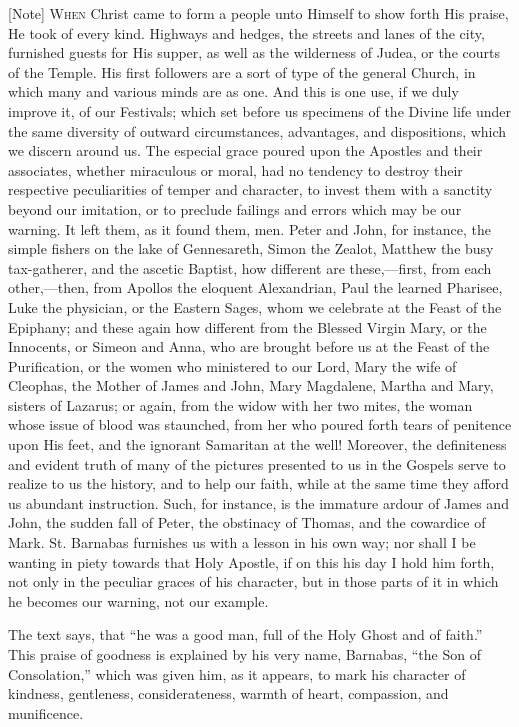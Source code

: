 [Note] W\textsc{hen} Christ came to form a
people unto Himself to show forth His praise, He took of every kind.
Highways and hedges, the streets and lanes of the city, furnished guests
for His supper, as well as the wilderness of Judea, or the courts of the
Temple. His first followers are a sort of type of the general Church, in
which many and various minds are as one. And this is one use, if we duly
improve it, of our Festivals; which set before us specimens of the
Divine life under the same diversity of outward circumstances,
advantages, and dispositions, which we discern around us. The especial
grace poured upon the Apostles and their associates, whether miraculous
or moral, had no tendency to destroy their respective peculiarities of
temper and character, to invest them with a sanctity beyond our
imitation, or to preclude failings and errors which may be our warning.
It left them, as it found them, men. Peter and John, for instance, the
simple fishers on the lake of Gennesareth, Simon the Zealot, Matthew the
busy tax-gatherer, and the ascetic Baptist, how different are these,—first,
from each other,—then, from Apollos the eloquent Alexandrian, Paul the
learned Pharisee, Luke the physician, or the Eastern Sages, whom we
celebrate at the Feast of the Epiphany; and these again how different
from the Blessed Virgin Mary, or the Innocents, or Simeon and Anna, who
are brought before us at the Feast of the Purification, or the women who
ministered to our Lord, Mary the wife of Cleophas, the Mother of James
and John, Mary Magdalene, Martha and Mary, sisters of Lazarus; or again,
from the widow with her two mites, the woman whose issue of blood was
staunched, from her who poured forth tears of penitence upon His feet,
and the ignorant Samaritan at the well! Moreover, the definiteness and
evident truth of many of the pictures presented to us in the Gospels
serve to realize to us the history, and to help our faith, while at the
same time they afford us abundant instruction. Such, for instance, is
the immature ardour of James and John, the sudden fall of Peter, the
obstinacy of Thomas, and the cowardice of Mark. St. Barnabas furnishes
us with a lesson in his own way; nor shall I be wanting in piety towards
that Holy Apostle, if on this his day I hold him forth, not only in the
peculiar graces of his character, but in those parts of it in which he
becomes our warning, not our example.

The text says, that ``he was a good man, full of the Holy Ghost
and of faith.'' This praise of goodness is explained by his very
name, Barnabas, ``the Son of Consolation,'' which was given him,
as it appears, to mark his character of kindness, gentleness,
considerateness, warmth of heart, compassion, and munificence.

